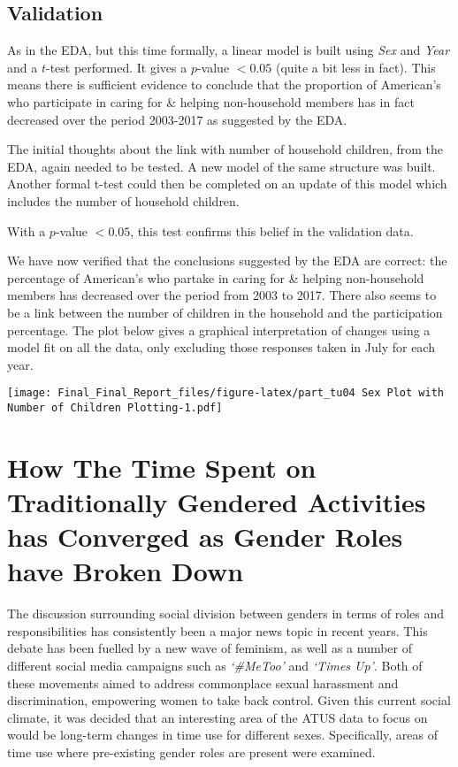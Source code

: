 \documentclass[11pt,]{article}
\begin{document}
\hypertarget{validation}{%
\subsection{Validation}\label{validation}}

As in the EDA, but this time formally, a linear model is built using
\emph{Sex} and \emph{Year} and a \(t\)-test performed. It gives a
\(p\)-value \(< 0.05\) (quite a bit less in fact). This means there is
sufficient evidence to conclude that the proportion of American's who
participate in caring for \& helping non-household members has in fact
decreased over the period 2003-2017 as suggested by the EDA.

The initial thoughts about the link with number of household children,
from the EDA, again needed to be tested. A new model of the same
structure was built. Another formal t-test could then be completed on an
update of this model which includes the number of household children.

With a \(p\)-value \(< 0.05\), this test confirms this belief in the
validation data.

We have now verified that the conclusions suggested by the EDA are
correct: the percentage of American's who partake in caring for \&
helping non-household members has decreased over the period from 2003 to
2017. There also seems to be a link between the number of children in
the household and the participation percentage. The plot below gives a
graphical interpretation of changes using a model fit on all the data,
only excluding those responses taken in July for each year.

\texttt{[image: Final\_Final\_Report\_files/figure-latex/part\_tu04 Sex Plot with Number of Children Plotting-1.pdf]}

\hypertarget{how-the-time-spent-on-traditionally-gendered-activities-has-converged-as-gender-roles-have-broken-down}{%
\section{How The Time Spent on Traditionally Gendered Activities has
Converged as Gender Roles have Broken
Down}\label{how-the-time-spent-on-traditionally-gendered-activities-has-converged-as-gender-roles-have-broken-down}}

The discussion surrounding social division between genders in terms of
roles and responsibilities has consistently been a major news topic in
recent years. This debate has been fuelled by a new wave of feminism, as
well as a number of different social media campaigns such as
\emph{`\#MeToo'} and \emph{`Times Up'}. Both of these movements aimed to
address commonplace sexual harassment and discrimination, empowering
women to take back control. Given this current social climate, it was
decided that an interesting area of the ATUS data to focus on would be
long-term changes in time use for different sexes. Specifically, areas
of time use where pre-existing gender roles are present were examined.
\end{document}
